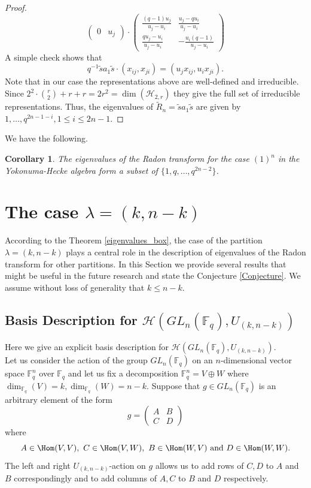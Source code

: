 \documentclass[12pt,reqno]{amsart}
\newtheorem{cor}[thm]{Corollary}
\theoremstyle{definition}
\theoremstyle{remark}
\numberwithin{equation}{section}
\newcommand{\GL}[1]{GL_{#1}(\mathbb{F}_q)}
\begin{document}
\begin{proof}
\[\begin{pmatrix}
    0 & u_j
\end{pmatrix} \cdot \begin{pmatrix}
    \frac{(q-1)u_j}{u_j-u_i} & \frac{u_j-qu_i}{u_j-u_i}\\
    \frac{qu_j-u_i}{u_j-u_i} & -\frac{u_i(q-1)}{u_j-u_i}
\end{pmatrix}
\]
A simple check shows that
\[
q^{-1}\tilde sa_1 \tilde s\cdot (x_{ij},x_{ji})=(u_jx_{ij},u_ix_{ji}).
\]
Note that in our case the representations above are well-defined and irreducible. Since $2^2 \cdot {r\choose 2} + r+r=2r^2 = \dim(\mathcal{H}_{2,r})$ they give the full set of irreducible representations. Thus, the eigenvalues of $\tilde R_n= \tilde sa_1 \tilde s$ are given by $1,\dots,q^{2n-1-i}, 1\le i\le 2n-1$.
\end{proof}
We have the following.
\begin{cor}\label{triang_unipotent_Yok}
    The eigenvalues of the Radon transform for the case $(1)^n$ in the Yokonuma-Hecke algebra form a subset of $\{1,q,\dots, q^{2n-2}\}$.
\end{cor}

\section{The case $\lambda=(k,n-k)$}
According to the Theorem \ref{eigenvalues_box}, the case of the partition $\lambda=(k,n-k)$ plays a central role in the description of eigenvalues of the Radon transform for other partitions. In this Section we provide several results that might be useful in the future research and state the Conjecture \ref{Conjecture}. We assume without loss of generality that $k\le n-k$.\\

\subsection{Basis Description for $\mathcal{H}(\GL{n},U_{(k,n-k)})$} Here we give an explicit basis description for $\mathcal{H}(\GL{n},U_{(k,n-k)})$.\\

Let us consider the action of the group $\GL{n}$ on an $n$-dimensional vector space $\mathbb{F}_q^n$ over $\mathbb{F}_q$ and let us fix a decomposition $\mathbb{F}_q^n = V\oplus W$ where $\dim_{\mathbb{F}_q}(V)=k,\dim_{\mathbb{F}_q}(W)=n-k$. Suppose that $g\in \GL{n}$ is an arbitrary element of the form
\begin{equation}\label{block_matrix}
    g=\begin{pmatrix}
    A & B\\
    C & D
\end{pmatrix}
\end{equation}
where 
\[
    A\in \Hom (V,V),\ C\in \Hom(V,W),\ B\in \Hom(W,V) \text{ and } D\in \Hom(W,W).
\]
The left and right $U_{(k,n-k)}$-action on $g$ allows us to add rows of $C,D$ to $A$ and $B$ correspondingly and to add columns of $A,C$ to $B$ and $D$ respectively.\\
\end{document}
